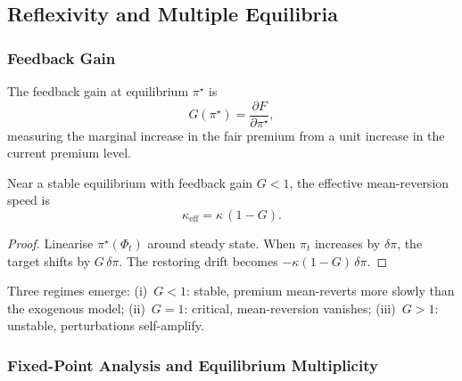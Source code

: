 \subsection{Reflexivity and Multiple Equilibria}
\label{sec:multiple_equilibria}

\subsubsection{Feedback Gain}\label{sec:feedback_gain}

\begin{definition}
  \label{def:feedback_gain}
  The feedback gain at equilibrium $\pi^\star$ is
  \begin{equation}
    \label{eq:feedback_gain}
    G(\pi^\star)
    = \frac{\partial F}{\partial \pi^\star},
  \end{equation}
  measuring the marginal increase in the fair premium from a unit increase
  in the current premium level.
\end{definition}

\begin{proposition}
  \label{prop:effective_kappa}
  Near a stable equilibrium with feedback gain $G < 1$, the effective
  mean-reversion speed is
  \begin{equation}
    \label{eq:kappa_eff}
    \boxed{
      \kappa_{\mathrm{eff}} = \kappa\,(1 - G).
    }
  \end{equation}
\end{proposition}

\begin{proof}
  Linearise $\pi^\star(\Phi_t)$ around steady state.  When $\pi_t$ increases
  by $\delta\pi$, the target shifts by $G\,\delta\pi$.  The restoring drift
  becomes $-\kappa(1 - G)\,\delta\pi$.
\end{proof}

Three regimes emerge: (i)~$G < 1$: stable, premium mean-reverts more slowly
than the exogenous model; (ii)~$G = 1$: critical, mean-reversion vanishes;
(iii)~$G > 1$: unstable, perturbations self-amplify.

\subsubsection{Fixed-Point Analysis and Equilibrium Multiplicity}
\label{sec:fixed_point}

